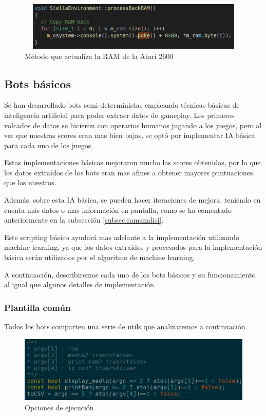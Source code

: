 \begin{figure}[h]
	\centering
	\includegraphics[width=1\textwidth,height=23mm]{Figures/processBackRAM}
	\caption{Método que actualiza la RAM de la Atari 2600}
	\label{fig:processBackRAM}
\end{figure}

\newpage
\subsection{Bots básicos}
\label{subsec:botsbasicos}
Se han desarrollado bots semi-deterministas empleando técnicas básicas de inteligencia artificial para poder extraer datos de gameplay. Los primeros volcados de datos se hicieron con operarios humanos jugando a los juegos, pero al ver que nuestras scores eran mas bien bajas, se optó por implementar IA básica para cada uno de los juegos. 

Estas implementaciones básicas mejoraron mucho las scores obtenidas, por lo que los datos extraídos de los bots eran mas afines a obtener mayores puntuaciones que los nuestros.

Además, sobre esta IA básica, se pueden hacer iteraciones de mejora, teniendo en cuenta más datos o mas información en pantalla, como se ha comentado anteriormente en la subsección \ref{subsec:ramanalisi}.

Este scripting básico ayudará mas adelante a la implementación utilizando machine learning, ya que los datos extraídos y procesados para la implementación básica serán utilizados por el algoritmo de machine learning.

A continuación, describiremos cada uno de los bots básicos y su funcionamiento al igual que algunos detalles de implementación.

\subsubsection{Plantilla común}
\label{subsec:botsbasicos:plantcomun}
Todos los bots comparten una serie de utils que analizaremos a continuación.

\begin{figure}[h]
	\centering
	\includegraphics[width=1\textwidth]{Figures/ALEMediaSettings}
	\caption{Opciones de ejecución}
	\label{fig:ALEMediaSettings}
\end{figure}

